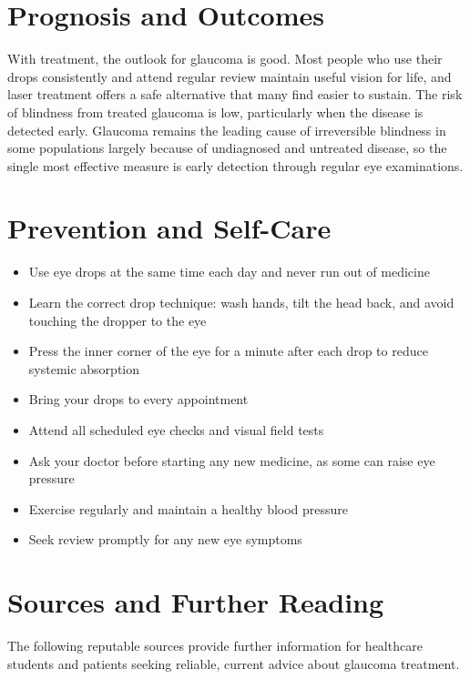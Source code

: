 \section*{Prognosis and Outcomes}
With treatment, the outlook for glaucoma is good. Most people who use their drops consistently and attend regular review maintain useful vision for life, and laser treatment offers a safe alternative that many find easier to sustain. The risk of blindness from treated glaucoma is low, particularly when the disease is detected early. Glaucoma remains the leading cause of irreversible blindness in some populations largely because of undiagnosed and untreated disease, so the single most effective measure is early detection through regular eye examinations.

\section*{Prevention and Self-Care}
\begin{itemize}
    \item Use eye drops at the same time each day and never run out of medicine
    \item Learn the correct drop technique: wash hands, tilt the head back, and avoid touching the dropper to the eye
    \item Press the inner corner of the eye for a minute after each drop to reduce systemic absorption
    \item Bring your drops to every appointment
    \item Attend all scheduled eye checks and visual field tests
    \item Ask your doctor before starting any new medicine, as some can raise eye pressure
    \item Exercise regularly and maintain a healthy blood pressure
    \item Seek review promptly for any new eye symptoms
\end{itemize}

\section*{Sources and Further Reading}
The following reputable sources provide further information for healthcare students and patients seeking reliable, current advice about glaucoma treatment.

